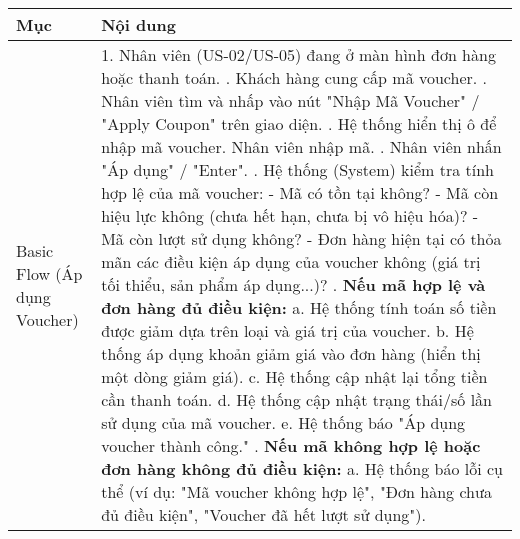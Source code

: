 \begin{longtable}{|m{4cm}|p{11cm}|}
\hline
\textbf{Mục} & \textbf{Nội dung} \\
\hline
Basic Flow (Áp dụng Voucher) & 1. Nhân viên (US-02/US-05) đang ở màn hình đơn hàng hoặc thanh toán. \newline 2. Khách hàng cung cấp mã voucher. \newline 3. Nhân viên tìm và nhấp vào nút "Nhập Mã Voucher" / "Apply Coupon" trên giao diện. \newline 4. Hệ thống hiển thị ô để nhập mã voucher. Nhân viên nhập mã. \newline 5. Nhân viên nhấn "Áp dụng" / "Enter". \newline 6. Hệ thống (System) kiểm tra tính hợp lệ của mã voucher: \newline    - Mã có tồn tại không? \newline    - Mã còn hiệu lực không (chưa hết hạn, chưa bị vô hiệu hóa)? \newline    - Mã còn lượt sử dụng không? \newline    - Đơn hàng hiện tại có thỏa mãn các điều kiện áp dụng của voucher không (giá trị tối thiểu, sản phẩm áp dụng...)? \newline 7. \textbf{Nếu mã hợp lệ và đơn hàng đủ điều kiện:} \newline    a. Hệ thống tính toán số tiền được giảm dựa trên loại và giá trị của voucher. \newline    b. Hệ thống áp dụng khoản giảm giá vào đơn hàng (hiển thị một dòng giảm giá). \newline    c. Hệ thống cập nhật lại tổng tiền cần thanh toán. \newline    d. Hệ thống cập nhật trạng thái/số lần sử dụng của mã voucher. \newline    e. Hệ thống báo "Áp dụng voucher thành công." \newline 8. \textbf{Nếu mã không hợp lệ hoặc đơn hàng không đủ điều kiện:} \newline    a. Hệ thống báo lỗi cụ thể (ví dụ: "Mã voucher không hợp lệ", "Đơn hàng chưa đủ điều kiện", "Voucher đã hết lượt sử dụng"). \\
\hline

\end{longtable}
